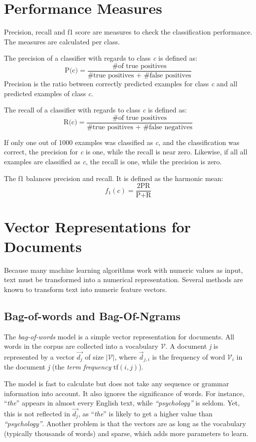 \section{Performance Measures}
Precision, recall and f1 score are measures to check the classification performance. The measures are calculated per class.

The precision of a classifier with regards to class \emph{c} is defined as:
\[ \text{P(c)} = \frac{\text{\# of true positives}}{\text{\# true positives + \# false positives}} \]
Precision is the ratio between correctly predicted examples for class \emph{c} and all predicted examples of class \emph{c}.


The recall of a classifier with regards to class \emph{c} is defined as:
\[ \text{R(c)} = \frac{\text{\# of true positives}}{\text{\# true positives + \# false negatives}} \]


If only one out of 1000 examples was classified as \emph{c}, and the classification was correct, the precision for \emph{c} is one, while the recall is near zero. Likewise, if all  all examples are classified as \emph{c}, the recall is one, while the precision is zero. 

The f1 balances precision and recall. It is defined as the harmonic mean:
\[ f_{1}(c) = \frac{\text{2PR}}{\text{P+R}} \]

\section{Vector Representations for Documents}
Because many machine learning algorithms work with numeric values as input, text must be transformed into a numerical representation. Several methods are known to transform text into numeric feature vectors.
\subsection{Bag-of-words and Bag-Of-Ngrams}
The \emph{bag-of-words} model is a simple vector representation for documents. All words in the corpus are collected into a vocabulary $\mathcal{V}$. A document  \emph{j} is represented by a vector $\vec{d_j}$ of size $|\mathcal{V}|$, where $\vec{d}_{j,i}$ is the frequency of word $\mathcal{V}_i$ in the document \emph{j} (the \emph{term frequency} $\text{tf}(i,j)$).

The model is fast to calculate but does not take any sequence or grammar information into account. It also ignores the significance of words. For instance, \enquote{\emph{the}} appears in almost every English text, while \emph{\enquote{psychology}} is seldom. Yet, this is not reflected in $\vec{d_j}$, as \enquote{\emph{the}} is likely to get a higher value than \emph{\enquote{psychology}}. Another problem is that the vectors are as long as the vocabulary (typically thousands of words) and sparse, which adds more parameters to learn.

